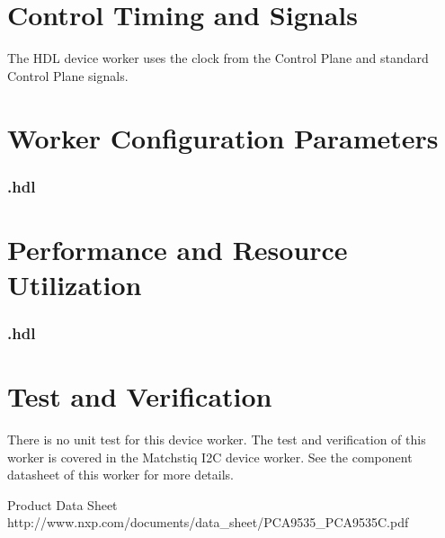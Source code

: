 \section*{Control Timing and Signals}
The \Comp{} HDL device worker uses the clock from the Control Plane and standard Control Plane signals.

\begin{landscape}
\section*{Worker Configuration Parameters}
\subsubsection*{\comp.hdl}
%
\section*{Performance and Resource Utilization}
\subsubsection*{\comp.hdl}
%
\end{landscape}
\section*{Test and Verification}
There is no unit test for this device worker. The test and verification of this worker is covered in the Matchstiq I2C device worker. See the component datasheet of this worker for more details.
  \begin{thebibliography}{1}

   \Comp{} Product Data Sheet\\
	http://www.nxp.com/documents/data\_sheet/PCA9535\_PCA9535C.pdf
  \end{thebibliography}

